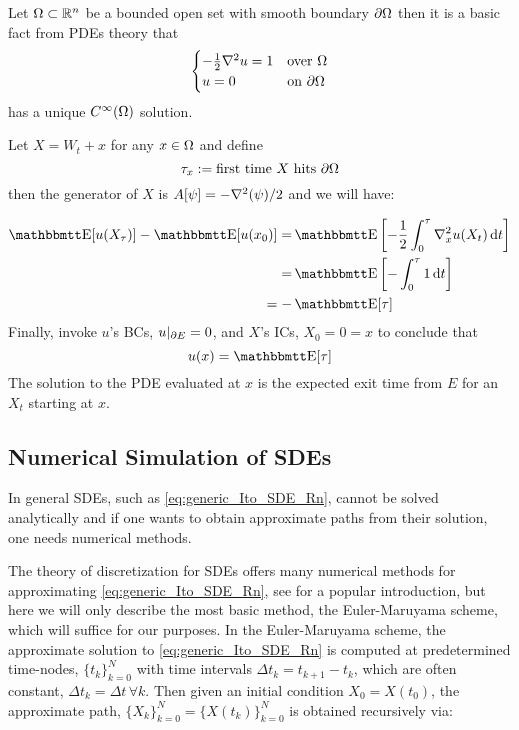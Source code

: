 \begin{ex}
\label{ex:mean_hitting_time}
 Let ${\Omega}
\subset { \mathbb{R} }^n$ be a bounded open set with smooth boundary ${\partial} {\Omega}$ then it is a
basic fact from PDEs theory that
\begin{equation}
\begin{cases}
-\frac{1}{2} { \nabla }^2 u = 1  & \text{over } {\Omega}
\\
u =  0 &\text{on } {\partial} {\Omega}
\end{cases}
\end{equation}
has a unique $C^\infty({\Omega})$ solution.

Let $X = W_t + x$ for any $x \in {\Omega}$ and define
 $${\tau}_x := \text{first time } X \text{ hits } {\partial} {\Omega}$$
then the generator of $X$ is $A[\psi] = -{ \nabla }^2(\psi)/2$ and we will
have:

\begin{align*}
\Exp[u(X_\t)] - \Exp[ u(x_0)] =&
 \Exp \left[ -\frac{1}{2}\int_0^\t \grad_x^2 u(X_t) \intd{t} \right]
\\
=& \Exp \left[ - \int_0^\t 1  \intd{t} 
\right]
\\
=-&\Exp [\t]
\end{align*}
Finally, invoke $u$'s BCs, $u|_{{\partial} E} = 0$, and $X$'s ICs, $X_0=0 = x$ to
conclude that $$ u(x) = \Exp [\t]$$
The solution to the PDE evaluated at $x$ is the expected exit time from
$E$ for an $X_t$  starting at $x$.
\end{ex}


\subsection{Numerical Simulation of SDEs}
In general SDEs, such as \cref{eq:generic_Ito_SDE_Rn}, cannot be solved
analytically and if one wants to obtain approximate paths from their solution,
one needs numerical methods.  

The theory of discretization for SDEs offers many numerical methods for
approximating \cref{eq:generic_Ito_SDE_Rn}, see \cite{Higham2001} for a popular
introduction, but here we will only describe the most basic method, the Euler-Maruyama scheme, which will suffice for our
purposes. In the Euler-Maruyama scheme, the approximate solution to
\cref{eq:generic_Ito_SDE_Rn} is computed at predetermined time-nodes,
$\{t_k\}_{k=0}^N$ with time intervals $\Delta t_k = t_{k+1} - t_{k }$, which
are often constant, $\Delta t_k = \Delta t\, \forall k$. Then given an initial
condition $X_0 = X(t_0)$, the approximate path, $\{X_k\}_{k=0}^N =
\{X(t_k)\}_{k=0}^N$ is obtained recursively via:

